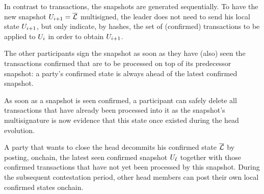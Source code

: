 In contrast to transactions, the snapshots are generated
sequentially.
To have the new snapshot $U_{i+1}=\overline {\mathcal L}$ multisigned, the leader does
not need to send his local state $U_{i+1}$, but only indicate,
by hashes, the set of (confirmed) transactions to be applied to $U_i$
in order to obtain $U_{i+1}$.

The other participants sign the snapshot as soon as they have (also) seen
the transactions confirmed that are to be processed on top of its predecessor
snapshot: a party's confirmed state is always ahead of the latest
confirmed snapshot.

As soon as a snapshot is seen confirmed, a participant can safely
delete all transactions that have already been processed into it as the
snapshot's multisignature is now evidence that this state once existed
during the head evolution.

A party that wants to close the head decommits his confirmed state
$\overline {\mathcal L}$ by posting, onchain, the latest seen confirmed snapshot
$U_\ell$ together with those confirmed transactions that have not
yet been processed by this snapshot.  During the
subsequent contestation period, other head members can post their own
local confirmed states onchain.
